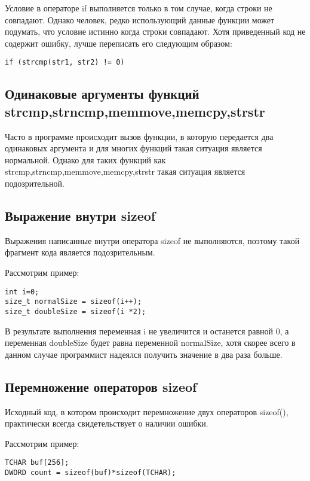 Условие в операторе if выполняется только в том случае, когда строки не совпадают. Однако человек,
редко использующий данные функции может подумать, что условие истинно когда строки совпадают.
Хотя приведенный код не содержит ошибку, лучше переписать его следующим образом:
\begin{lstlisting}
if (strcmp(str1, str2) != 0)
\end{lstlisting}

\subsection{Одинаковые аргументы функций strcmp,strncmp,memmove,memcpy,strstr}
\label{sec:eqArgs}
Часто в программе происходит вызов функции, в которую передается два одинаковых аргумента и для
многих функций такая ситуация является нормальной. Однако для таких функций как strcmp,strncmp,memmove,memcpy,strstr
такая ситуация является подозрительной.

\subsection{Выражение внутри sizeof}
\label{sec:sizeof}
Выражения написанные внутри оператора sizeof не выполняются, поэтому такой фрагмент кода является подозрительным.

Рассмотрим пример:
\begin{lstlisting}
int i=0;
size_t normalSize = sizeof(i++);
size_t doubleSize = sizeof(i *2);
\end{lstlisting}

В результате выполнения переменная i не увеличится и останется равной 0, а переменная doubleSize
будет равна переменной normalSize, хотя скорее всего в данном случае программист надеялся получить
значение в два раза больше. 

\subsection{Перемножение операторов sizeof}
\label{sec:sizeofMul}
Исходный код, в котором происходит перемножение двух операторов sizeof(), практически всегда
свидетельствует о наличии ошибки.

Рассмотрим пример:
\begin{lstlisting}
TCHAR buf[256];
DWORD count = sizeof(buf)*sizeof(TCHAR);
\end{lstlisting}

